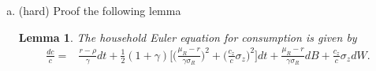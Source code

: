 \documentclass[11pt]{extarticle}
\theoremstyle{plain}
\newtheorem{lem}[thm]{Lemma}
\theoremstyle{definition}
\begin{document}
\begin{enumerate}[(a)]
\begin{lem}\label{lem:MUEuler}
	
	The household Euler equation for marginal utility is given by
	\begin{equation*}
		\frac{d u_c}{u_c} = (\rho - r) dt -  \frac{\mu_R - r}{\sigma_R} dB  - \gamma \frac{c_z}{c} \sigma_z dW .
	\end{equation*}
	
\end{lem}


\item  (hard)  Proof the following lemma 

\begin{lem}
	
	The household Euler equation for consumption is given by
	\begin{align*}
		\frac{dc}{c} = & \frac{r - \rho}{\gamma} dt + \frac{1}{2} (1+\gamma) \bigg[ \bigg( \frac{\mu_R - r}{\gamma \sigma_R} \bigg)^2 + \bigg( \frac{c_z}{c} \sigma_z \bigg)^2 \bigg] dt +  \frac{\mu_R - r}{\gamma \sigma_R} dB  + \frac{c_z}{c} \sigma_z dW .
	\end{align*}	
\end{lem}







\end{enumerate}
\end{document}

